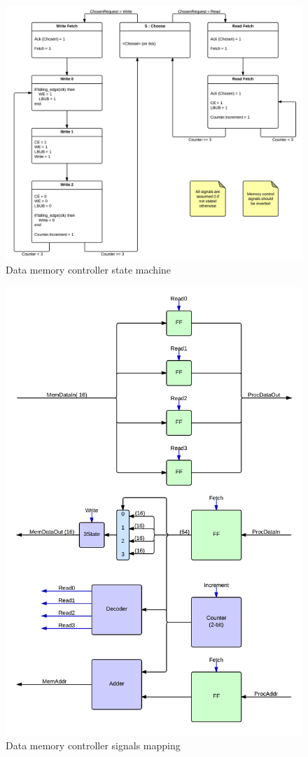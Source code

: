 \begin{figure}[H]
  \centering
  \includegraphics[width=\textwidth]{fpga/fig/memory_ctrl_state_machine.png}
  \caption{Data memory controller state machine}
  \label{fpga:fig:mem:data_memory_ctrl_state_machine}
\end{figure}


\begin{figure}[H]
  \centering
  \includegraphics[width=\textwidth]{fpga/fig/memory_ctrl.png}
  \caption{Data memory controller signals mapping}
  \label{fpga:fig:mem:data_memory_ctrl}
\end{figure}


